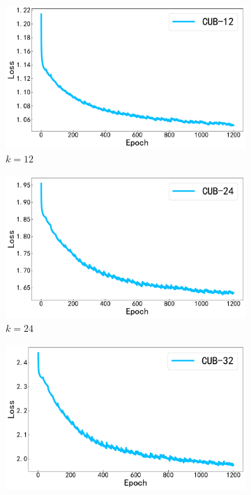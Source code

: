 \begin{figure}[h]
  \centering
  \begin{subfigure}{0.48\textwidth}
    \centering
    \includegraphics[width=\linewidth]{./Img/CUB-12.pdf}
    \caption{$k=12$}\label{fig:4-24}
  \end{subfigure}
  \hfil
  \begin{subfigure}{0.48\textwidth}
    \centering
    \includegraphics[width=\linewidth]{./Img/CUB-24.pdf}
    \caption{$k=24$}\label{fig:4-25}
  \end{subfigure}
  \hfil
  \begin{subfigure}{0.48\textwidth}
    \centering
    \includegraphics[width=\linewidth]{./Img/CUB-32.pdf}

\end{subfigure}
\end{figure}
